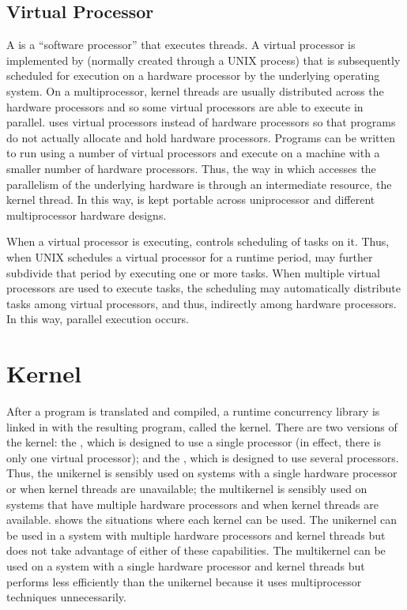\documentclass[openright,twoside]{report}
\begin{document}
\subsection{Virtual Processor}
\label{s:RuntimeStructureProcessor}

A \uC {} is a ``software processor'' that executes threads.
A virtual processor is implemented by  (normally created through a UNIX process) that is subsequently scheduled for execution on a hardware processor by the underlying operating system.
On a multiprocessor, kernel threads are usually distributed across the hardware processors and so some virtual processors are able to execute in parallel.
\uC uses virtual processors instead of hardware processors so that programs do not actually allocate and hold hardware processors.
Programs can be written to run using a number of virtual processors and execute on a machine with a smaller number of hardware processors.
Thus, the way in which \uC accesses the parallelism of the underlying hardware is through an intermediate resource, the kernel thread.
In this way, \uC is kept portable across uniprocessor and different multiprocessor hardware designs.

When a virtual processor is executing, \uC controls scheduling of tasks on it.
Thus, when UNIX schedules a virtual processor for a runtime period, \uC may further subdivide that period by executing one or more tasks.
When multiple virtual processors are used to execute tasks, the \uC scheduling may automatically distribute tasks among virtual processors, and thus, indirectly among hardware processors.
In this way, parallel execution occurs.


\section{\texorpdfstring{\uC Kernel}{uC++ Kernel}}
\label{s:uCKernel}

After a \uC program is translated and compiled, a runtime concurrency library is linked in with the resulting program, called the \uC kernel.
There are two versions of the \uC kernel:
the , which is designed to use a single processor (in effect, there is only one virtual processor);
and the , which is designed to use several processors.
Thus, the unikernel is sensibly used on systems with a single hardware processor or when kernel threads are unavailable;
the multikernel is sensibly used on systems that have multiple hardware processors and when kernel threads are available.
 shows the situations where each kernel can be used.
The unikernel can be used in a system with multiple hardware processors and kernel threads but does not take advantage of either of these capabilities.
The multikernel can be used on a system with a single hardware processor and kernel threads but performs less efficiently than the unikernel because it uses multiprocessor techniques unnecessarily.
\end{document}
